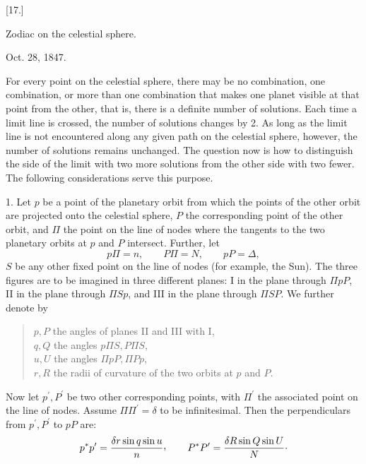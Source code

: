 \hypertarget{native-322-zusatz17}{}
\begin{center}
[17.]

Zodiac on the celestial sphere.

Oct. 28, 1847.
\end{center}

For every point on the celestial sphere, there may be no combination, one combination, or more than one combination that makes one planet visible at that point from the other, that is, there is a definite number of solutions. Each time a limit line is crossed, the number of solutions changes by 2. As long as the limit line is not encountered along any given path on the celestial sphere, however, the number of solutions remains unchanged. The question now is how to distinguish the side of the limit with two more solutions from the other side with two fewer. The following considerations serve this purpose.

1. Let \(p\) be a point of the planetary orbit from which the points of the other orbit are projected onto the celestial sphere, \(P\) the corresponding point of the other orbit, and \(\Pi\) the point on the line of nodes where the tangents to the two planetary orbits at \(p\) and \(P\) intersect. Further, let
\[
p\Pi=n,\qquad P\Pi=N,\qquad pP=\Delta,
\]
\(S\) be any other fixed point on the line of nodes (for example, the Sun). The three figures are to be imagined in three different planes: I in the plane through \(\Pi pP\), II in the plane through \(\Pi Sp\), and III in the plane through \(\Pi SP\). We further denote by
\begin{quote}
\noindent \(p,P\) the angles of planes II and III with I,\\
\(q,Q\) the angles \(p\Pi S,P\Pi S\),\\
\(u,U\) the angles \(\Pi pP,\Pi Pp\),\\
\(r,R\) the radii of curvature of the two orbits at \(p\) and \(P\).
\end{quote}

Now let \(p^{\prime},P^{\prime}\) be two other corresponding points, with \(\Pi^{\prime}\) the associated point on the line of nodes. Assume \(\Pi\Pi^{\prime}=\delta\) to be infinitesimal. Then the perpendiculars from \(p^{\prime},P^{\prime}\) to \(pP\) are:
\[
p^{*}p^{\prime}=\frac{\delta r\sin q\sin u}{n}\mathpunct{\raisebox{.45ex}{\normalfont,}}\qquad
P^{*}P^{\prime}=\frac{\delta R\sin Q\sin U}{N}\mathpunct{\cdot}
\]

